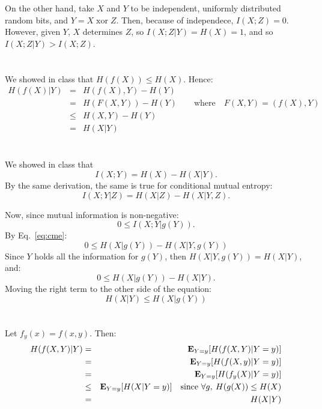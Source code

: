 \documentclass[11pt]{article} \usepackage{amssymb}
\newcommand{\E}{{\bf E}} \newcommand{\Cov}{{\bf Cov}}
\begin{document}
On the other hand, take $X$ and $Y$ to be independent, uniformly distributed
random bits, and $Y = X\; \mbox{xor}\; Z$. Then, because of independece, $I(X;Z)=0$.
However, given $Y$, $X$ determines $Z$, so $I(X;Z|Y)=H(X)=1$, and
so $I(X;Z|Y)>I(X;Z)$.

\section{}
We showed in class that $H(f(X)) \leq H(X)$. Hence:
\begin{eqnarray*}
  H(f(X)|Y)
  &=& H(f(X), Y) - H(Y)\\
  &=& H(F(X,Y)) - H(Y)\quad\quad \mbox{where}\quad F(X,Y) = (f(X),Y)\\
  &\leq& H(X,Y) - H(Y)\\
  &=& H(X|Y)
\end{eqnarray*}
\section{}
We showed in class that 
\begin{equation*}
  I(X;Y)=H(X)-H(X|Y). 
\end{equation*}
By the same derivation, the same is true for conditional mutual entropy:
\begin{equation}
  \label{eq:cme}
  I(X;Y|Z)=H(X|Z)-H(X|Y,Z).
\end{equation}

Now, since mutual information is non-negative:
\begin{equation*}
  0 \leq I(X;Y|g(Y)).  
\end{equation*}
By Eq.~\ref{eq:cme}:
\begin{equation*}
  0  \leq H(X|g(Y)) - H(X|Y,g(Y))  
\end{equation*}
Since $Y$ holds all the information for $g(Y)$, then $H(X|Y,g(Y))=H(X|Y)$,
and:
\begin{equation*}
  0  \leq H(X|g(Y)) - H(X|Y).  
\end{equation*}
Moving the right term to the other side of the equation:
\begin{equation*}
   H(X|Y)  \leq H(X|g(Y))
\end{equation*}

\section{}
Let $f_y(x)=f(x,y)$. Then:
\begin{eqnarray*}
  H(f(X,Y)|Y) 
  &=& \E_{Y=y}[H(f(X,Y)|Y=y)]\\
  &=& \E_{Y=y}[H(f(X,y)|Y=y)]\\
  &=& \E_{Y=y}[H(f_y(X)|Y=y)]\\
  &\leq& \E_{Y=y}[H(X|Y=y)]\quad\mbox{since $\forall g,\:H(g(X))\leq H(X)$}\\
  &=& H(X|Y)
\end{eqnarray*}
\end{document}
